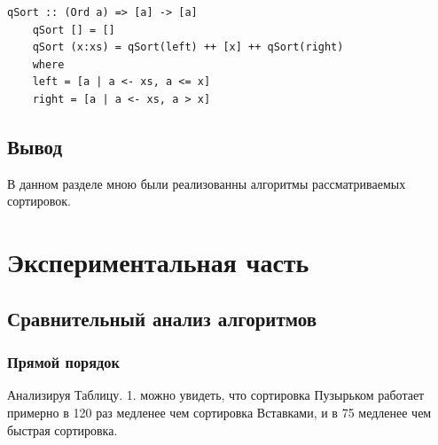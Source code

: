 \documentclass[12pt]{report}
\begin{document}
\begin{lstlisting}[label=some-code,caption=Быстрая сортировка]
	qSort :: (Ord a) => [a] -> [a]
	qSort [] = []
	qSort (x:xs) = qSort(left) ++ [x] ++ qSort(right)
	where
	left = [a | a <- xs, a <= x]
	right = [a | a <- xs, a > x]
\end{lstlisting}


\section*{Вывод}
В данном разделе мною были реализованны алгоритмы рассматриваемых сортировок.

\chapter{Экспериментальная часть}
\section{Сравнительный анализ алгоритмов}

\subsection{Прямой порядок}

Анализируя Таблицу. 1. можно увидеть, что сортировка Пузырьком работает примерно в 120 раз медленее чем сортировка Вставками, и в 75 медленее чем быстрая сортировка.
\end{document}
